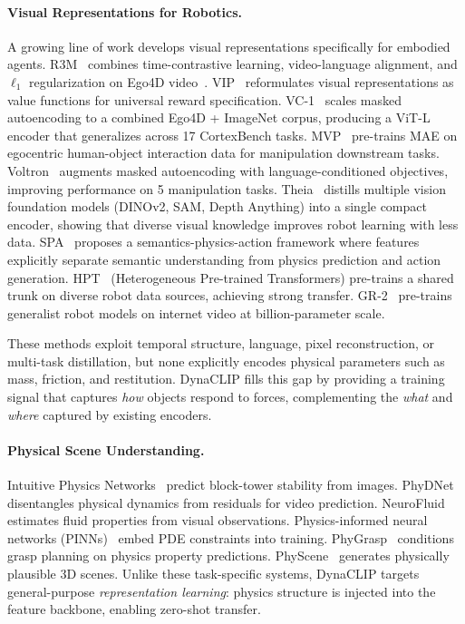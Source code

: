 \documentclass{article}
\newcommand{\methodname}{DynaCLIP}
\begin{document}
\paragraph{Visual Representations for Robotics.}
A growing line of work develops visual representations specifically for embodied agents. R3M~\cite{nair2022r3m} combines time-contrastive learning, video-language alignment, and $\ell_1$ regularization on Ego4D video~\cite{grauman2022ego4d}. VIP~\cite{ma2022vip} reformulates visual representations as value functions for universal reward specification. VC-1~\cite{radosavovic2023vc1} scales masked autoencoding to a combined Ego4D + ImageNet corpus, producing a ViT-L encoder that generalizes across 17 CortexBench tasks. MVP~\cite{xiao2022mvp} pre-trains MAE on egocentric human-object interaction data for manipulation downstream tasks. Voltron~\cite{karamcheti2023voltron} augments masked autoencoding with language-conditioned objectives, improving performance on 5 manipulation tasks. Theia~\cite{shang2024theia} distills multiple vision foundation models (DINOv2, SAM, Depth Anything) into a single compact encoder, showing that diverse visual knowledge improves robot learning with less data. SPA~\cite{sun2024spa} proposes a semantics-physics-action framework where features explicitly separate semantic understanding from physics prediction and action generation. HPT~\cite{wang2024hpt} (Heterogeneous Pre-trained Transformers) pre-trains a shared trunk on diverse robot data sources, achieving strong transfer. GR-2~\cite{cheang2024gr2} pre-trains generalist robot models on internet video at billion-parameter scale.

These methods exploit temporal structure, language, pixel reconstruction, or multi-task distillation, but none explicitly encodes physical parameters such as mass, friction, and restitution. \methodname{} fills this gap by providing a training signal that captures \emph{how} objects respond to forces, complementing the \emph{what} and \emph{where} captured by existing encoders.

\paragraph{Physical Scene Understanding.}
Intuitive Physics Networks~\cite{lerer2016learning} predict block-tower stability from images. PhyDNet~\cite{guen2020disentangling} disentangles physical dynamics from residuals for video prediction. NeuroFluid~\cite{guan2022neurofluid} estimates fluid properties from visual observations. Physics-informed neural networks (PINNs)~\cite{raissi2019pinn} embed PDE constraints into training. PhyGrasp~\cite{zhang2024physgrasp} conditions grasp planning on physics property predictions. PhyScene~\cite{yang2024physcene} generates physically plausible 3D scenes. Unlike these task-specific systems, \methodname{} targets general-purpose \emph{representation learning}: physics structure is injected into the feature backbone, enabling zero-shot transfer.
\end{document}
